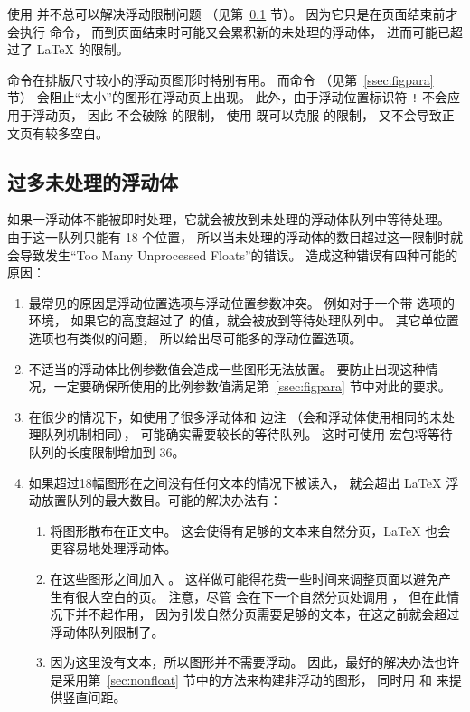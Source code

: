 \begin{description}
	使用  并不总可以解决浮动限制问题
	（见第~\ref{ssec:toomanyfig} 节）。
	因为它只是在页面结束前才会执行  命令，
	而到页面结束时可能又会累积新的未处理的浮动体，
	进而可能已超过了 \LaTeX{} 的限制。
	
	 命令在排版尺寸较小的浮动页图形时特别有用。
	而命令  （见第~\ref{ssec:figpara} 节）
	会阻止“太小”的图形在浮动页上出现。
	此外，由于浮动位置标识符 \texttt{!} 不会应用于浮动页，
	因此 \opt{[!p]} 不会破除  的限制，
	使用  既可以克服  的限制，
	又不会导致正文页有较多空白。
\end{description}


\subsection{过多未处理的浮动体}\label{ssec:toomanyfig}

如果一浮动体不能被即时处理，它就会被放到未处理的浮动体队列中等待处理。
由于这一队列只能有 18 个位置，
所以当未处理的浮动体的数目超过这一限制时就会导致发生“Too Many Unprocessed Floats”的错误。
造成这种错误有四种可能的原因：

\begin{enumerate}
	\item 最常见的原因是浮动位置选项与浮动位置参数冲突。
	例如对于一个带 \opt{[t]} 选项的  环境，
	如果它的高度超过了  的值，就会被放到等待处理队列中。
	其它单位置选项也有类似的问题，
	所以给出尽可能多的浮动位置选项。

	\item 不适当的浮动体比例参数值会造成一些图形无法放置。
	要防止出现这种情况，一定要确保所使用的比例参数值满足第~\ref{ssec:figpara} 节中对此的要求。

	\item 在很少的情况下，如使用了很多浮动体和  边注
	（会和浮动体使用相同的未处理队列机制相同），
	可能确实需要较长的等待队列。
	这时可使用  宏包将等待队列的长度限制增加到 36。

	\item 如果超过18幅图形在之间没有任何文本的情况下被读入，
	就会超出 \LaTeX{} 浮动放置队列的最大数目。可能的解决办法有：
	
	\begin{enumerate}
		\item 将图形散布在正文中。
		这会使得有足够的文本来自然分页，\LaTeX{} 也会更容易地处理浮动体。
		\item 在这些图形之间加入 。
		这样做可能得花费一些时间来调整页面以避免产生有很大空白的页。
		注意，尽管  会在下一个自然分页处调用 ，
		但在此情况下并不起作用，
		因为引发自然分页需要足够的文本，在这之前就会超过浮动体队列限制了。
		\item 因为这里没有文本，所以图形并不需要浮动。
		因此，最好的解决办法也许是采用第~\ref{sec:nonfloat} 节中的方法来构建非浮动的图形，
		同时用  和  来提供竖直间距。
	\end{enumerate}
\end{enumerate}


